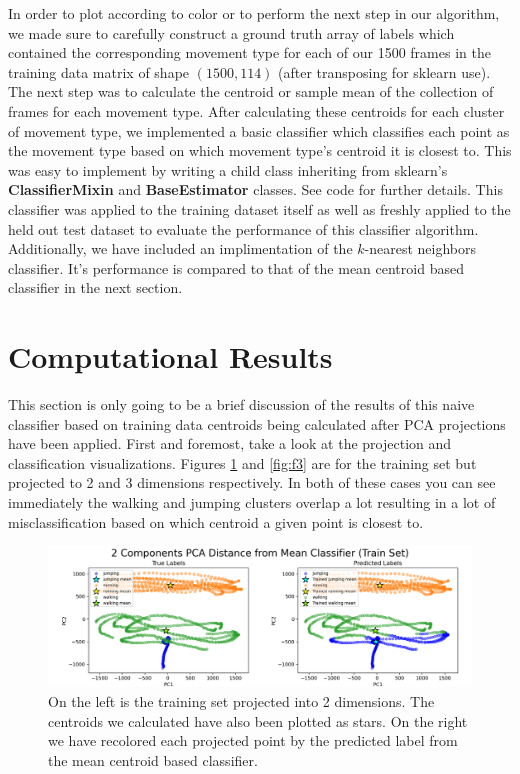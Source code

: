 \documentclass[11pt]{amsart}
\begin{document}
In order to plot according to color or to perform the next step in our algorithm, we made sure to carefully construct a ground truth array of labels which contained the corresponding movement type for each of our 1500 frames in the training data matrix of shape $(1500, 114)$ (after transposing for sklearn use).
The next step was to calculate the centroid or sample mean of the collection of frames for each movement type.
After calculating these centroids for each cluster of movement type, we implemented a basic classifier which classifies each point as the movement type based on which movement type's centroid it is closest to.
This was easy to implement by writing a child class inheriting from sklearn's \textbf{ClassifierMixin} and \textbf{BaseEstimator} classes.
See code for further details.
This classifier was applied to the training dataset itself as well as freshly applied to the held out test dataset to evaluate the performance of this classifier algorithm.
Additionally, we have included an implimentation of the $k$-nearest neighbors classifier.
It's performance is compared to that of the mean centroid based classifier in the next section.

\section{Computational Results}\label{sec:results}
This section is only going to be a brief discussion of the results of this naive classifier based on training data centroids being calculated after PCA projections have been applied.
First and foremost, take a look at the projection and classification visualizations. Figures \ref{fig:f2} and \ref{fig:f3} are for the training set but projected to 2 and 3 dimensions respectively.
In both of these cases you can see immediately the walking and jumping clusters overlap a lot resulting in a lot of misclassification based on which centroid a given point is closest to.

\begin{figure}[h]
	\centering
	\includegraphics[width=.75\textwidth]{../visualizations/pca_distance_from_mean_classifier_2d.png}
 	\caption{On the left is the training set projected into 2 dimensions.
	The centroids we calculated have also been plotted as stars.
	On the right we have recolored each projected point by the predicted label from the mean centroid based classifier.}\label{fig:f2}
\end{figure}
\end{document}
